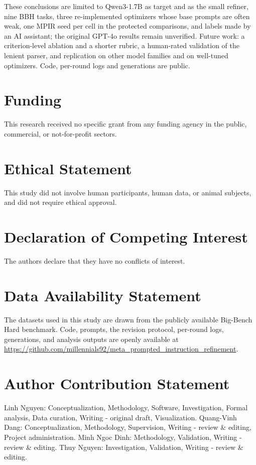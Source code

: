 \documentclass{ieeeaccess}
\begin{document}
These conclusions are limited to Qwen3-1.7B as target and as the small refiner, nine BBH tasks, three re-implemented optimizers whose base prompts are often weak, one MPIR seed per cell in the protected comparisons, and labels made by an AI assistant; the original GPT-4o results remain unverified. Future work: a criterion-level ablation and a shorter rubric, a human-rated validation of the lenient parser, and replication on other model families and on well-tuned optimizers. Code, per-round logs and generations are public.

\section{Funding}

This research received no specific grant from any funding agency in the public, commercial, or not-for-profit sectors.

\section{Ethical Statement}

This study did not involve human participants, human data, or animal subjects, and did not require ethical approval.

\section{Declaration of Competing Interest}

The authors declare that they have no conflicts of interest.

\section{Data Availability Statement}

The datasets used in this study are drawn from the publicly available Big-Bench Hard benchmark. Code, prompts, the revision protocol, per-round logs, generations, and analysis outputs are openly available at \url{https://github.com/millennials92/meta_prompted_instruction_refinement}.

\section{Author Contribution Statement}

Linh Nguyen: Conceptualization, Methodology, Software, Investigation, Formal analysis, Data curation, Writing - original draft, Visualization. Quang-Vinh Dang: Conceptualization, Methodology, Supervision, Writing - review \& editing, Project administration. Minh Ngoc Dinh: Methodology, Validation, Writing - review \& editing. Thuy Nguyen: Investigation, Validation, Writing - review \& editing.
\end{document}
